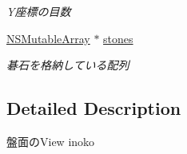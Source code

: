 \begin{DoxyCompactItemize}
\begin{DoxyCompactList}\small\item\em Y座標の目数 \end{DoxyCompactList}\item 
\hypertarget{interface_board_view_a7cb31e0f64bad49e0782aef0048920cc}{
\hyperlink{class_n_s_mutable_array}{NSMutableArray} $\ast$ \hyperlink{interface_board_view_a7cb31e0f64bad49e0782aef0048920cc}{stones}}
\label{interface_board_view_a7cb31e0f64bad49e0782aef0048920cc}

\begin{DoxyCompactList}\small\item\em 碁石を格納している配列 \end{DoxyCompactList}\end{DoxyCompactItemize}


\subsection{Detailed Description}
盤面のView  inoko 

